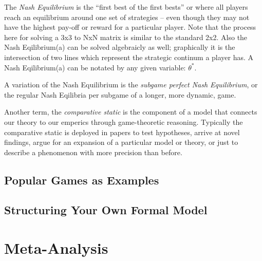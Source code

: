 \documentclass[12pt]{article}\usepackage[]{graphicx}\usepackage[]{color}
\begin{document}
\begin{flushleft}
The \textit{Nash Equilibrium} is the ``first best of the first bests'' or where all players reach an equilibrium around one set of strategies -- even though they may not have the highest pay-off or reward for a particular player. Note that the process here for solving a 3x3 to NxN matrix is similar to the standard 2x2. Also the Nash Eqilibrium(a) can be solved algebraicly as well; graphically it is the intersection of two lines which represent the strategic continum a player has. A Nash Eqilibrium(a) can be notated by any given variable: $\theta^*$.

A variation of the Nash Equilibrium is the \textit{subgame perfect Nash Equilibrium}, or the regular Nash Eqilibria per subgame of a longer, more dynamic, game.

Another term, the \textit{comparative static} is the component of a model that connects our theory to our emperics through game-theoretic reasoning. Typically the comparative static is deployed in papers to test hypotheses, arrive at novel findings, argue for an expansion of a particular model or theory, or just to describe a phenomenon with more precision than before.


\subsection{Popular Games as Examples}






\subsection{Structuring Your Own Formal Model}


\clearpage

\section{Meta-Analysis}


\end{flushleft}
\end{document}
